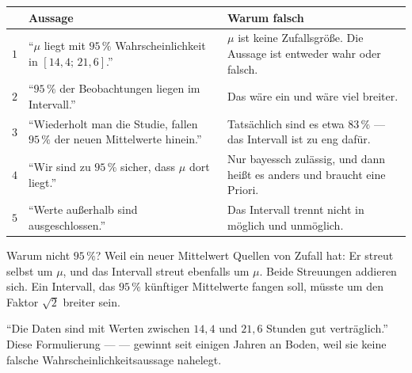 \begin{warnung}
\begin{center}
{\small
\renewcommand{\arraystretch}{1.55}
\begin{tabular}{@{}P{0.7cm}P{4.0cm}P{3.6cm}@{}}
\toprule
& \textbf{Aussage} & \textbf{Warum falsch}\\
\midrule
$1$ & \enquote{$\mu$ liegt mit $95\,\%$ Wahrscheinlichkeit in $[14{,}4;\,21{,}6]$.} & $\mu$ ist keine Zufallsgröße. Die Aussage ist entweder wahr oder falsch.\\
$2$ & \enquote{$95\,\%$ der Beobachtungen liegen im Intervall.} & Das wäre ein  und wäre viel breiter.\\
$3$ & \enquote{Wiederholt man die Studie, fallen $95\,\%$ der neuen Mittelwerte hinein.} & Tatsächlich sind es etwa $83\,\%$ --- das Intervall ist zu eng dafür.\\
$4$ & \enquote{Wir sind zu $95\,\%$ sicher, dass $\mu$ dort liegt.} & Nur bayessch zulässig, und dann heißt es anders und braucht eine Priori.\\
$5$ & \enquote{Werte außerhalb sind ausgeschlossen.} & Das Intervall trennt nicht in möglich und unmöglich.\\
\bottomrule
\end{tabular}}
\end{center}

Warum nicht $95\,\%$? Weil ein neuer Mittelwert  Quellen von Zufall hat: Er streut selbst um $\mu$, und das Intervall streut ebenfalls um $\mu$. Beide Streuungen addieren sich. Ein Intervall, das $95\,\%$ künftiger Mittelwerte fangen soll, müsste um den Faktor $\sqrt 2$ breiter sein.

\begin{center}
\begin{minipage}{0.88\textwidth}
\end{minipage}
\end{center}

\begin{center}
\begin{minipage}{0.88\textwidth}
\enquote{Die Daten sind mit Werten zwischen $14{,}4$ und $21{,}6$ Stunden gut verträglich.} Diese Formulierung ---  --- gewinnt seit einigen Jahren an Boden, weil sie keine falsche Wahrscheinlichkeitsaussage nahelegt.
\end{minipage}
\end{center}
\end{warnung}

